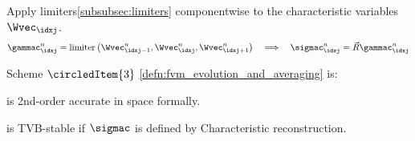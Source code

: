 \begin{defnbox}\nospacing
    \begin{defn}\label{defn:characteristic_reconstruction}
        Apply limiters\cref{subsubsec:limiters} componentwise to the characteristic variables $\Wvec_{\idxj}$.
        \begin{align}
          \gammac_{\idxj}^{n}=\text{limiter}\left(\Wvec_{\idxj-1}^{n},\Wvec_{\idxj}^{n},\Wvec_{\idxj+1}^{n}\right)&&\implies&&\sigmac_{\idxj}^{n}=\vec{R}\gammac_{\idxj}^{n}
        \end{align}
    \end{defn}
\end{defnbox}
\begin{corbox}\nospacing
    \begin{cor}
        Scheme $\circledItem{3}$ \cref{defn:fvm_evolution_and_averaging} is:
        \begin{itemizenosep}
            \item is 2nd-order accurate in space formally.
            \item is TVB-stable if $\sigmac$ is defined by Characteristic reconstruction.
        \end{itemizenosep}
    \end{cor}
\end{corbox}

